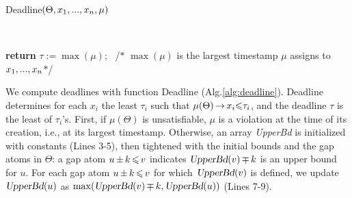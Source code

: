\begin{algorithm}[t]
\caption{{\sf Deadline}$(\Theta,x_1,...,x_{n},\mu)$}
\label{alg:deadline}
\begin{small}\vspace*{-2.5mm}
\begin{flushleft}
  \\
  \end{flushleft}\vspace*{-3.5mm}
  \begin{algorithmic}[1]
    {\bf return} $\tau := \max(\mu)$;\vspace*{-2pt}\newline\mbox{~}\hfill
    /$*$ $\max(\mu)$ is the largest timestamp $\mu$ assigns to $x_1,...,x_{n}$$*$/
  \EndIf{}
  \EndFor
      \EndIf
    \EndFor
  \EndFor
  \end{algorithmic}
\end{small}
\end{algorithm}  

We compute deadlines with function {\sf Deadline} (Alg.\:\ref{alg:deadline}).
{\sf Deadline}
determines
for each $x_i$ the least $\tau_i$ such that 
$\mu(\Theta)
\,{\rightarrow}\, 
x_i{\leqslant}\tau_i$,
and
the deadline $\tau$ is the least of $\tau_i$'s.
First, if $\mu(\Theta)$ is unsatisfiable,
$\mu$ is a violation
at the time of its creation,
i.e., at its largest timestamp.
Otherwise,
an array \textsl{UpperBd} is initialized
with constants (Lines 3-5),
then tightened
with the initial bounds
and the gap atoms in $\Theta$:
a gap atom $u\,{\pm}\, k\,{\leqslant}\, v$
indicates $\textsl{UpperBd}(v)\,{\mp}\, k$ is an upper bound for $u$.
For each gap atom $u\,{\pm}\, k\,{\leqslant}\, v$
for which $\textsl{UpperBd}(v)$ is defined,
we update
$\textsl{UpperBd}(u)$ as $\max(\textsl{UpperBd}(v)\,{\mp}\, k,
\textsl{UpperBd}(u))$
(Lines 7-9).

